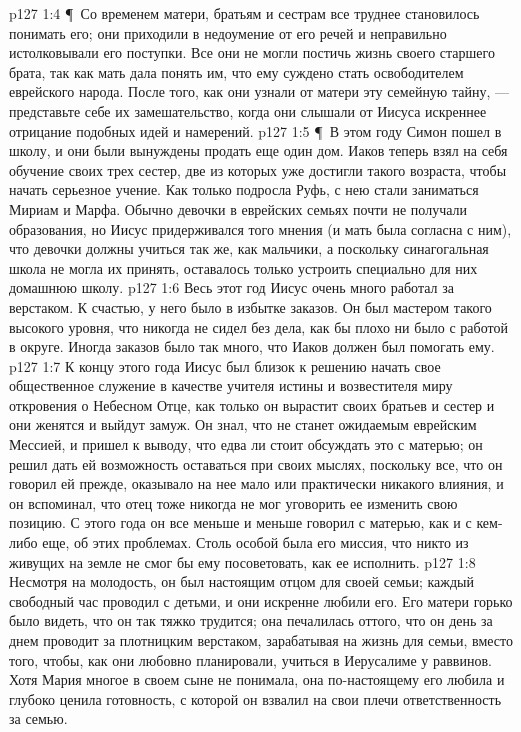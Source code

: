 \vs p127 1:4 \P\ Со временем матери, братьям и сестрам все труднее становилось понимать его; они приходили в недоумение от его речей и неправильно истолковывали его поступки. Все они не могли постичь жизнь своего старшего брата, так как мать дала понять им, что ему суждено стать освободителем еврейского народа. После того, как они узнали от матери эту семейную тайну, --- представьте себе их замешательство, когда они слышали от Иисуса искреннее отрицание подобных идей и намерений.
\vs p127 1:5 \P\ В этом году Симон пошел в школу, и они были вынуждены продать еще один дом. Иаков теперь взял на себя обучение своих трех сестер, две из которых уже достигли такого возраста, чтобы начать серьезное учение. Как только подросла Руфь, с нею стали заниматься Мириам и Марфа. Обычно девочки в еврейских семьях почти не получали образования, но Иисус придерживался того мнения (и мать была согласна с ним), что девочки должны учиться так же, как мальчики, а поскольку синагогальная школа не могла их принять, оставалось только устроить специально для них домашнюю школу.
\vs p127 1:6 Весь этот год Иисус очень много работал за верстаком. К счастью, у него было в избытке заказов. Он был мастером такого высокого уровня, что никогда не сидел без дела, как бы плохо ни было с работой в округе. Иногда заказов было так много, что Иаков должен был помогать ему.
\vs p127 1:7 К концу этого года Иисус был близок к решению начать свое общественное служение в качестве учителя истины и возвестителя миру откровения о Небесном Отце, как только он вырастит своих братьев и сестер и они женятся и выйдут замуж. Он знал, что не станет ожидаемым еврейским Мессией, и пришел к выводу, что едва ли стоит обсуждать это с матерью; он решил дать ей возможность оставаться при своих мыслях, поскольку все, что он говорил ей прежде, оказывало на нее мало или практически никакого влияния, и он вспоминал, что отец тоже никогда не мог уговорить ее изменить свою позицию. С этого года он все меньше и меньше говорил с матерью, как и с кем\hyp{}либо еще, об этих проблемах. Столь особой была его миссия, что никто из живущих на земле не смог бы ему посоветовать, как ее исполнить.
\vs p127 1:8 Несмотря на молодость, он был настоящим отцом для своей семьи; каждый свободный час проводил с детьми, и они искренне любили его. Его матери горько было видеть, что он так тяжко трудится; она печалилась оттого, что он день за днем проводит за плотницким верстаком, зарабатывая на жизнь для семьи, вместо того, чтобы, как они любовно планировали, учиться в Иерусалиме у раввинов. Хотя Мария многое в своем сыне не понимала, она по\hyp{}настоящему его любила и глубоко ценила готовность, с которой он взвалил на свои плечи ответственность за семью.
